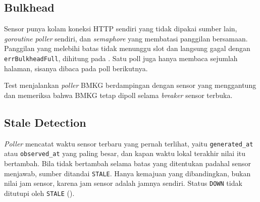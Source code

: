\subsection{Bulkhead}

Sensor punya kolam koneksi HTTP sendiri yang tidak dipakai sumber lain, \textit{goroutine} \textit{poller} sendiri, dan \textit{semaphore} yang membatasi panggilan bersamaan. Panggilan yang melebihi batas tidak menunggu slot dan langsung gagal dengan \texttt{errBulkheadFull}, dihitung pada . Satu poll juga hanya membaca sejumlah halaman, sisanya dibaca pada poll berikutnya.


Test  menjalankan \textit{poller} BMKG berdampingan dengan sensor yang menggantung dan memeriksa bahwa BMKG tetap dipoll selama \textit{breaker} sensor terbuka.

\subsection{Stale Detection}\label{sec:p5m2-stale}

\textit{Poller} mencatat waktu sensor terbaru yang pernah terlihat, yaitu \texttt{generated\_at} atau \texttt{observed\_at} yang paling besar, dan kapan waktu lokal terakhir nilai itu bertambah. Bila tidak bertambah selama batas yang ditentukan padahal sensor menjawab, sumber ditandai \texttt{STALE}. Hanya kemajuan yang dibandingkan, bukan nilai jam sensor, karena jam sensor adalah jamnya sendiri. Status \texttt{DOWN} tidak ditutupi oleh \texttt{STALE} ().


